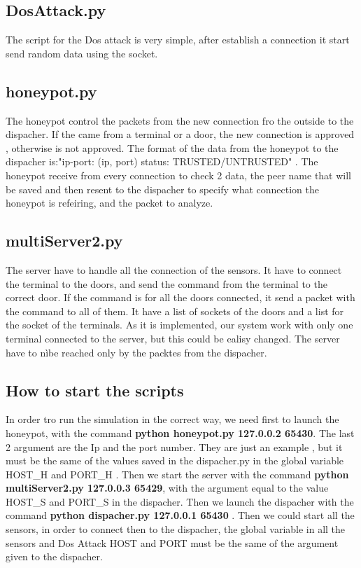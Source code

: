 \subsection{DosAttack.py}
The script for the Dos attack is very simple,  after establish a connection it start send random data using the socket. 


\subsection{honeypot.py}
The honeypot control the packets from the new connection fro the outside to the dispacher. If the came from a terminal or a door, the new connection is approved , otherwise is not approved. The format of the data from the honeypot to the dispacher is:"ip-port: (ip, port) status: TRUSTED/UNTRUSTED" . The honeypot receive from every connection to check 2 data, the peer name that will be saved and then resent to the dispacher to specify what connection the honeypot is refeiring, and the packet to analyze. 

\subsection{multiServer2.py}
The server have to handle all the connection of the sensors. It have to connect the terminal to the doors, and send the command from the terminal to the correct door. If the command is for all the doors connected, it send a packet with the command to all of them. It have a list of sockets of the doors and a list for the socket of the terminals. As it is implemented, our system work with only one terminal connected to the server, but this could be ealisy changed. The server have to nìbe reached only by the packtes from the dispacher. 

\subsection{How to start the scripts}
In order tro run the simulation in the correct way, we need first to launch the honeypot, with the command \textbf{python honeypot.py 127.0.0.2 65430}. The last 2 argument are the Ip and the port number. They are just an example , but it must be the same of the values saved in the dispacher.py in the global variable HOST\_H and PORT\_H . Then we start the server with the command  \textbf{python multiServer2.py 127.0.0.3 65429}, with the argument equal to the value HOST\_S and PORT\_S in the dispacher. Then we launch the dispacher with the command  \textbf{python dispacher.py 127.0.0.1 65430} . Then we could start all the sensors, in order to connect then to the dispacher, the global variable in all the sensors and Dos Attack HOST and PORT must be the same of the argument given to the dispacher. 

